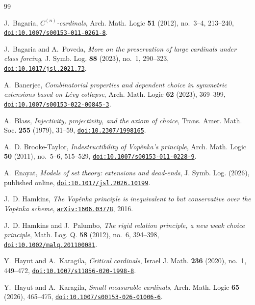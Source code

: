 \documentclass[11pt,a4paper]{amsart}
\theoremstyle{plain}
\theoremstyle{definition}
\theoremstyle{remark}
\begin{document}
\begin{thebibliography}{99}

J.~Bagaria,
\emph{$C^{(n)}$-cardinals},
Arch. Math. Logic \textbf{51} (2012), no.~3--4, 213--240,
\href{https://doi.org/10.1007/s00153-011-0261-8}{\nolinkurl{doi:10.1007/s00153-011-0261-8}}.

J.~Bagaria and A.~Poveda,
\emph{More on the preservation of large cardinals under class forcing},
J. Symb. Log. \textbf{88} (2023), no.~1, 290--323,
\href{https://doi.org/10.1017/jsl.2021.73}{\nolinkurl{doi:10.1017/jsl.2021.73}}.

A.~Banerjee,
\emph{Combinatorial properties and dependent choice in symmetric extensions based on L\'evy collapse},
Arch. Math. Logic \textbf{62} (2023), 369--399,
\href{https://doi.org/10.1007/s00153-022-00845-3}{\nolinkurl{doi:10.1007/s00153-022-00845-3}}.

A.~Blass,
\emph{Injectivity, projectivity, and the axiom of choice},
Trans. Amer. Math. Soc. \textbf{255} (1979), 31--59,
\href{https://doi.org/10.2307/1998165}{\nolinkurl{doi:10.2307/1998165}}.

A.~D. Brooke-Taylor,
\emph{Indestructibility of Vop\v{e}nka's principle},
Arch. Math. Logic \textbf{50} (2011), no.~5--6, 515--529{,
\href{https://doi.org/10.1007/s00153-011-0228-9}{\nolinkurl{doi:10.1007/s00153-011-0228-9}}}.

A.~Enayat,
\emph{Models of set theory: extensions and dead-ends},
{J. Symb. Log. (2026), published online,
\href{https://doi.org/10.1017/jsl.2026.10199}{\nolinkurl{doi:10.1017/jsl.2026.10199}}.}

J.~D. Hamkins,
\emph{The Vop\v{e}nka principle is inequivalent to but conservative over the Vop\v{e}nka scheme},
\href{https://arxiv.org/abs/1606.03778}{\nolinkurl{arXiv:1606.03778}}, 2016.

J.~D. Hamkins and J.~Palumbo,
\emph{The rigid relation principle, a new weak choice principle},
Math. Log. Q. \textbf{58} (2012), no.~6, 394--398,
\href{https://doi.org/10.1002/malq.201100081}{\nolinkurl{doi:10.1002/malq.201100081}}.

Y.~Hayut and A.~Karagila,
\emph{Critical cardinals},
Israel J. Math. \textbf{236} (2020), no.~1, 449--472,
\href{https://doi.org/10.1007/s11856-020-1998-8}{\nolinkurl{doi:10.1007/s11856-020-1998-8}}.

Y.~Hayut and A.~Karagila,
\emph{Small measurable cardinals},
Arch. Math. Logic \textbf{65} (2026), 465--475,
\href{https://doi.org/10.1007/s00153-026-01006-6}{\nolinkurl{doi:10.1007/s00153-026-01006-6}}.


\end{thebibliography}
\end{document}
